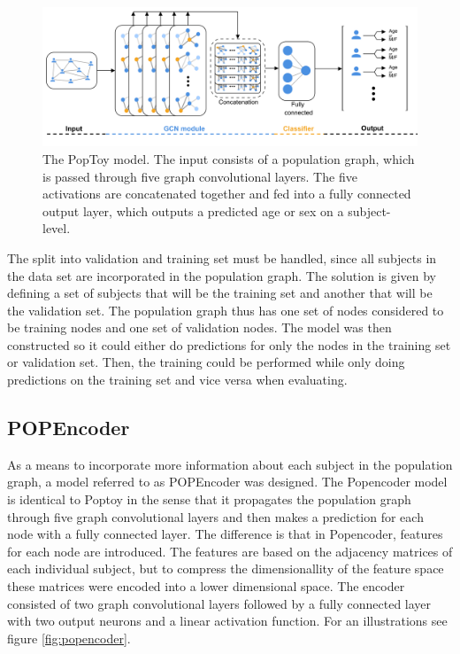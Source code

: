 \begin{figure}[!htbp]
    \centering
    \includegraphics[width=\textwidth]{chapters/images_methods/poptoy_v2.png}
    \caption{The PopToy model. The input consists of a population graph, which is passed through five graph convolutional layers. The five activations are concatenated together and fed into a fully connected output layer, which outputs a predicted age or sex on a subject-level.}
    \label{fig:poptoy}
\end{figure}

 The split into validation and training set must be handled, since all subjects in the data set are incorporated in the population graph. The solution is given by defining a set of subjects that will be the training set and another that will be the validation set. The population graph thus has one set of nodes considered to be training nodes and one set of validation nodes. The model was then constructed so it could either do predictions for only the nodes in the training set or validation set. Then, the training could be performed while only doing predictions on the training set and vice versa when evaluating.

\subsection{POPEncoder}
As a means to incorporate more information about each subject in the population graph, a model referred to as POPEncoder was designed. The Popencoder model is identical to Poptoy in the sense that it propagates the population graph through five graph convolutional layers and then makes a prediction for each node with a fully connected layer. The difference is that in Popencoder, features for each node are introduced. The features are based on the adjacency matrices of each individual subject, but to compress the dimensionallity of the feature space these matrices were encoded into a lower dimensional space. The encoder consisted of two graph convolutional layers followed by a fully connected layer with two output neurons and a linear activation function. For an illustrations see figure \ref{fig:popencoder}.

